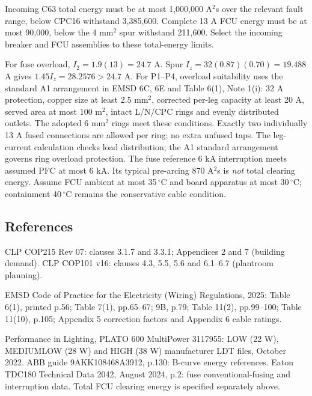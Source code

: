 Incoming C63 total energy must be at most 1,000,000 A$^2$s over the relevant fault range, below CPC16 withstand 3,385,600. Complete 13 A FCU energy must be at most 90,000, below the 4 mm$^2$ spur withstand 211,600. Select the incoming breaker and FCU assemblies to these total-energy limits.

For fuse overload, $I_2=1.9(13)=24.7$ A. Spur $I_z=32(0.87)(0.70)=19.488$ A gives $1.45I_z=28.2576>24.7$ A. For P1--P4, overload suitability uses the standard A1 arrangement in EMSD 6C, 6E and Table 6(1), Note 1(i): 32 A protection, copper size at least 2.5 mm$^2$, corrected per-leg capacity at least 20 A, served area at most 100 m$^2$, intact L/N/CPC rings and evenly distributed outlets. The adopted 6 mm$^2$ rings meet these conditions. Exactly two individually 13 A fused connections are allowed per ring; no extra unfused taps. The leg-current calculation checks load distribution; the A1 standard arrangement governs ring overload protection. The fuse reference 6 kA interruption meets assumed PFC at most 6 kA. Its typical pre-arcing 870 A$^2$s is \emph{not} total clearing energy. Assume FCU ambient at most 35\,$^\circ$C and board apparatus at most 30\,$^\circ$C;  containment 40\,$^\circ$C remains the conservative cable condition.
\subsection*{References}
CLP COP215 Rev 07: clauses 3.1.7 and 3.3.1; Appendices 2 and 7 (building demand). CLP COP101 v16: clauses 4.3, 5.5, 5.6 and 6.1--6.7 (plantroom planning).

EMSD Code of Practice for the Electricity (Wiring) Regulations, 2025: Table 6(1), printed p.56; Table 7(1), pp.65--67; 9B, p.79; Table 11(2), pp.99--100; Table 11(10), p.105; Appendix 5 correction factors and Appendix 6 cable ratings.

Performance in Lighting, PLATO 600 MultiPower 3117955: LOW (22 W), MEDIUMLOW (28 W) and HIGH (38 W) manufacturer LDT files, October 2022. ABB guide 9AKK108468A3912, p.130: B-curve energy references. Eaton TDC180 Technical Data 2042, August 2024, p.2: fuse conventional-fusing and interruption data. Total FCU clearing energy is specified separately above.
